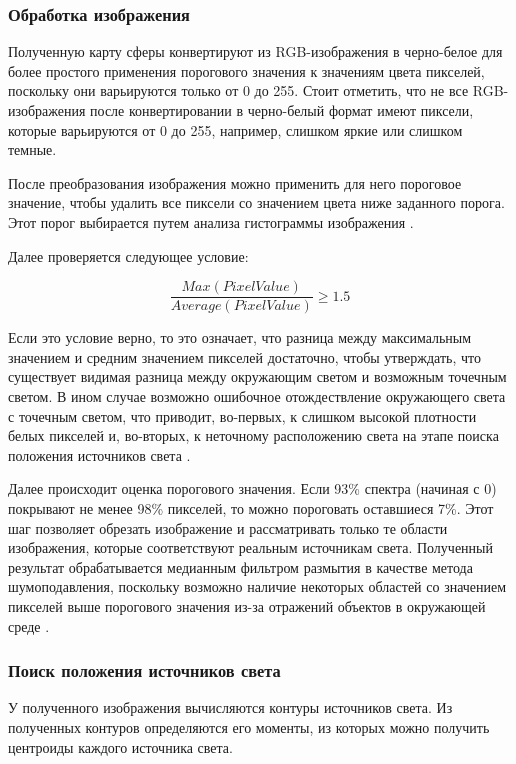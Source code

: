 \subsubsection*{Обработка изображения}

Полученную карту сферы конвертируют из RGB-изображения в черно-белое для более простого применения порогового значения к
значениям цвета пикселей, поскольку они варьируются только от 0 до 255. Стоит отметить, что не все RGB-изображения после конвертировании в черно-белый формат имеют пиксели, которые варьируются от 0 до 255, например, слишком яркие или слишком темные.

После преобразования изображения можно применить для него пороговое значение, чтобы удалить все пиксели со значением цвета ниже заданного порога. Этот порог выбирается путем анализа гистограммы изображения \cite{img_hists}.

Далее проверяется следующее условие:

\begin{equation}
	\frac{Max(PixelValue)}{Average(PixelValue)} \geq 1.5
\end{equation}

Если это условие верно, то это означает, что разница между максимальным значением и средним значением пикселей достаточно, чтобы утверждать, что существует видимая разница между окружающим светом и возможным точечным светом. В ином случае возможно ошибочное отождествление окружающего света с точечным светом, что приводит, во-первых, к слишком высокой плотности белых пикселей и, во-вторых, к неточному расположению света на этапе поиска положения источников света \cite{rtsm}.

Далее происходит оценка порогового значения. Если 93\% спектра (начиная с 0) покрывают не менее 98\% пикселей, то можно пороговать оставшиеся 7\%. Этот шаг позволяет обрезать изображение и рассматривать только те области изображения, которые соответствуют реальным источникам света. Полученный результат обрабатывается медианным фильтром размытия в качестве метода шумоподавления, поскольку возможно наличие некоторых областей со значением пикселей выше порогового значения из-за отражений объектов в окружающей среде \cite{rtsm}.

\subsubsection*{Поиск положения источников света}

У полученного изображения вычисляются контуры источников света. Из полученных контуров определяются его моменты, из которых можно получить центроиды каждого источника света.

